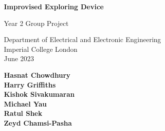 \begin{titlepage}
    \begin{center}
        \vspace*{1cm}

        \Huge
        \textbf{Improvised Exploring Device}
        \vspace{0.5cm}
        
        \LARGE
        Year 2 Group Project

        \vspace{1.5cm}
        
        Department of Electrical and Electronic Engineering \\
        Imperial College London \\
        June 2023

        \vfill

        \Large
        \textbf{Hasnat Chowdhury} \\
        \textbf{Harry Griffiths} \\
        \textbf{Kishok Sivakumaran} \\
        \textbf{Michael Yau} \\
        \textbf{Ratul Shek} \\
        \textbf{Zeyd Chamsi-Pasha}


    \end{center}
\end{titlepage}